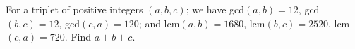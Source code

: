 For a triplet of positive integers $(a, b, c)$; we have gcd$(a, b) = 12$, gcd$(b, c) = 12$, gcd$(c, a) = 120$; and lcm$(a, b) = 1680$, lcm$(b, c) = 2520$, lcm$(c, a) = 720$. Find $a + b + c$.
